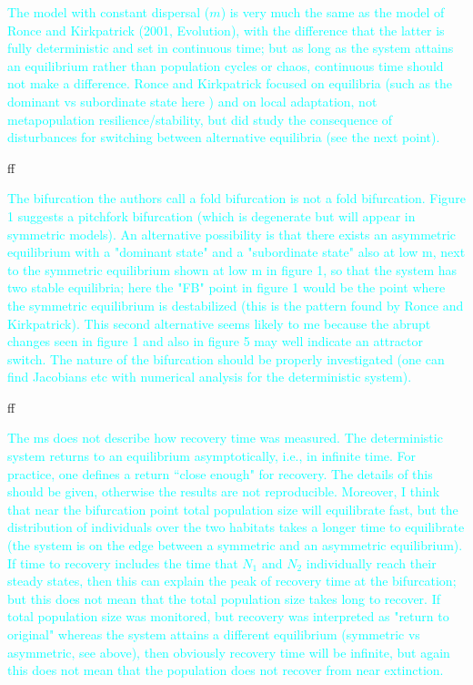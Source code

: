 \documentclass[ucm,12pt]{ucletter}
\begin{document}
\begin{letter}
\textcolor{cyan}{
The model with constant dispersal ($m$) is very much the same as the model of Ronce and Kirkpatrick (2001, Evolution), with the difference that the latter is fully deterministic and set in continuous time; but as long as the system attains an equilibrium rather than population cycles or chaos, continuous time should not make a difference. Ronce and Kirkpatrick focused on equilibria (such as the dominant vs subordinate state here ) and on local adaptation, not metapopulation resilience/stability, but did study the consequence of disturbances for switching between alternative equilibria (see the next point).
}

ff

\textcolor{cyan}{
The bifurcation the authors call a fold bifurcation is not a fold bifurcation. Figure 1 suggests a pitchfork bifurcation (which is degenerate but will appear in symmetric models). An alternative possibility is that there exists an asymmetric equilibrium with a "dominant state" and a "subordinate state" also at low m, next to the symmetric equilibrium shown at low m in figure 1, so that the system has two stable equilibria; here the "FB" point in figure 1 would be the point where the symmetric equilibrium is destabilized (this is the pattern found by Ronce and Kirkpatrick). This second alternative seems likely to me because the abrupt changes seen in figure 1 and also in figure 5 may well indicate an attractor switch. The nature of the bifurcation should be properly investigated (one can find Jacobians etc with numerical analysis for the deterministic system).
}

ff

\textcolor{cyan}{
The ms does not describe how recovery time was measured. The deterministic system returns to an equilibrium asymptotically, i.e., in infinite time. For practice, one defines a return ``close enough" for recovery. The details of this should be given, otherwise the results are not reproducible. Moreover, I think that near the bifurcation point total population size will equilibrate fast, but the distribution of individuals over the two habitats takes a longer time to equilibrate (the system is on the edge between a symmetric and an asymmetric equilibrium). If time to recovery includes the time that $N_1$ and $N_2$ individually reach their steady states, then this can explain the peak of recovery time at the bifurcation; but this does not mean that the total population size takes long to recover. If total population size was monitored, but recovery was interpreted as "return to original" whereas the system attains a different equilibrium (symmetric vs asymmetric, see above), then obviously recovery time will be infinite, but again this does not mean that the population does not recover from near extinction.
}


\end{letter}
\end{document}
